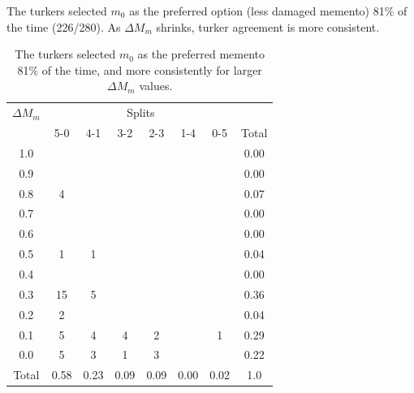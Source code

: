 The turkers selected $m_0$ as the preferred option (less damaged memento) 81\% of the time (226/280). As {$\Delta M_m$} shrinks, turker agreement is more consistent. 


\begin{table}
\begin{tabular}{ c | c | c | c | c | c | c || c}
    {$\Delta M_m$} &  \multicolumn{6}{c}{Splits}\\
  & 5-0 & 4-1 & 3-2 & 2-3 & 1-4 & 0-5 & Total\\
\hline
1.0   &  &  &  &  &  & & 0.00\\
0.9 &  &  &  &  &  & & 0.00\\
0.8 & 4 &  &  &  &  & & 0.07\\
0.7 &  &  &  &  &  & & 0.00\\
0.6 &  &  &  &  &  & & 0.00\\
0.5 & 1 & 1 &  &  &  & & 0.04\\
0.4 &  &  &  &  &  & & 0.00\\
0.3 & 15 & 5 &  &  &  & & 0.36\\
0.2 & 2 &  &  &  &  & & 0.04\\
0.1 & 5 & 4 & 4 & 2 &  & 1& 0.29\\
0.0 & 5 & 3 & 1 & 3 &  & & 0.22\\
\hline
Total & 0.58 & 0.23 & 0.09 & 0.09 & 0.00 & 0.02 & 1.0
\end{tabular}
  \caption{The turkers selected $m_0$ as the preferred memento 81\% of the time, and more consistently for larger {$\Delta M_m$} values.}
  \label{m0table}
\end{table}


